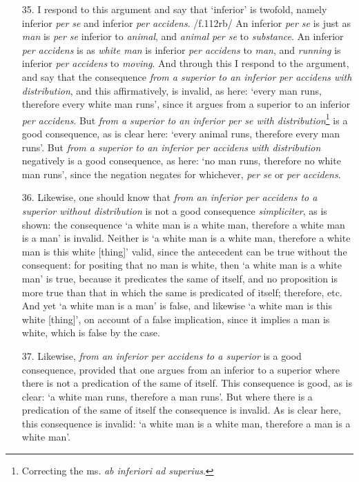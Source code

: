 \documentclass[]{article}
\begin{document}
\begin{enumerate}
\item[35.] I respond to this argument and say that `inferior' is twofold, namely inferior \textit{per se} and inferior \textit{per accidens}. /f.112rb/ An inferior \textit{per se} is just as \textit{man} is \textit{per se} inferior to \textit{animal}, and \textit{animal} \textit{per se} to \textit{substance}. An inferior \textit{per accidens} is as \textit{white man} is inferior \textit{per accidens} to \textit{man}, and \textit{running} is inferior \textit{per accidens} to \textit{moving}. And through this I respond to the argument, and say that the consequence \textit{from a superior to an inferior per accidens with distribution}, and this affirmatively, is invalid, as here: `every man runs, therefore every white man runs', since it argues from a superior to an inferior \textit{per accidens}. But \textit{from a superior to an inferior per se with distribution}\footnote{Correcting the ms. \textit{ab inferiori ad superius}.} is a good consequence, as is clear here: `every animal runs, therefore every man runs'. But \textit{from a superior to an inferior per accidens with distribution} negatively is a good consequence, as here: `no man runs, therefore no white man runs', since the negation negates for whichever, \textit{per se} or \textit{per accidens}. 
\item[36.] Likewise, one should know that \textit{from an inferior \textit{per accidens} to a superior without distribution} is not a good consequence \textit{simpliciter}, as is shown: the consequence `a white man is a white man, therefore a white man is a man' is invalid. Neither is `a white man is a white man, therefore a white man is this white [thing]' valid, since the antecedent can be true without the consequent: for positing that no man is white, then `a white man is a white man' is true, because it predicates the same of itself, and no proposition is more true than that in which the same is predicated of itself; therefore, etc. And yet `a white man is a man' is false, and likewise `a white man is this white [thing]', on account of a false implication, since it implies a man is white, which is false by the case.
\item[37.] Likewise, \textit{from an inferior per accidens to a superior} is a good consequence, provided that one argues from an inferior to a superior where there is not a predication of the same of itself. This consequence is good, as is clear: `a white man runs, therefore a man runs'. But where there is a predication of the same of itself the consequence is invalid. As is clear here, this consequence is invalid: `a white man is a white man, therefore a man is a white man'.
\end{enumerate}
\end{document}
